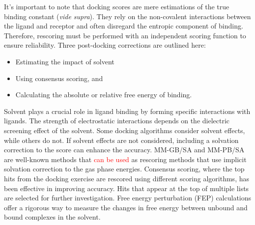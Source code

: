 \documentclass[10pt, a4paper]{book}
\begin{document}
{
}


It's important to note that docking scores are mere estimations of the true binding constant (\textit{vide supra}). They rely on the non-covalent interactions between the ligand and receptor and often disregard the entropic component of binding. Therefore, rescoring must be performed with an independent scoring function to ensure reliability.
    Three post-docking corrections are outlined here:
    \begin{itemize}
        \item Estimating the impact of solvent
        \item Using consensus scoring, and 
        \item Calculating the absolute or relative free energy of binding.
    \end{itemize}
Solvent plays a crucial role in ligand binding by forming specific interactions with ligands. The strength of electrostatic interactions depends on the dielectric screening effect of the solvent. Some docking algorithms consider solvent effects, while others do not. If solvent effects are not considered, including a solvation correction to the score can enhance the accuracy. MM-GB/SA and MM-PB/SA are well-known methods that \textcolor{red}{can be used} as rescoring methods that use implicit solvation correction to the gas phase energies\cite{bib13}. Consensus scoring, where the top hits from the docking exercise are rescored using different scoring algorithms, has been effective in improving accuracy. Hits that appear at the top of multiple lists are selected for further investigation. Free energy perturbation (FEP) calculations offer a rigorous way to measure the changes in free energy between unbound and bound complexes in the solvent.
\end{document}
